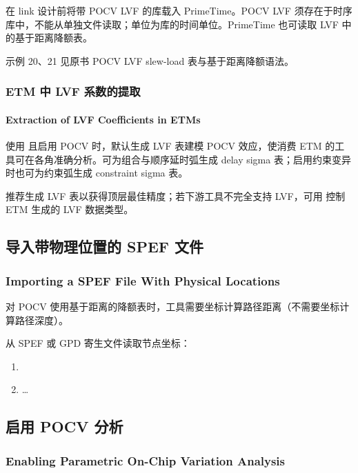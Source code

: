 在 link 设计前将带 POCV LVF 的库载入 PrimeTime。POCV LVF 须存在于时序库中，不能从单独文件读取；单位为库的时间单位。PrimeTime 也可读取 LVF 中的基于距离降额表。

\begin{seeAlsoBox}
示例 20、21 见原书 POCV LVF slew-load 表与基于距离降额语法。
\end{seeAlsoBox}

\subsubsection{ETM 中 LVF 系数的提取}
\paragraph*{Extraction of LVF Coefficients in ETMs}

使用  且启用 POCV 时，默认生成 LVF 表建模 POCV 效应，使消费 ETM 的工具可在各角准确分析。可为组合与顺序延时弧生成 delay sigma 表；启用约束变异时也可为约束弧生成 constraint sigma 表。

推荐生成 LVF 表以获得顶层最佳精度；若下游工具不完全支持 LVF，可用  控制 ETM 生成的 LVF 数据类型。

\subsection{导入带物理位置的 SPEF 文件}
\subsubsection*{Importing a SPEF File With Physical Locations}

对 POCV 使用基于距离的降额表时，工具需要坐标计算路径距离（不需要坐标计算路径深度）。

从 SPEF 或 GPD 寄生文件读取节点坐标：
\begin{enumerate}
  \item {}
  \item {} …
\end{enumerate}

\subsection{启用 POCV 分析}
\subsubsection*{Enabling Parametric On-Chip Variation Analysis}

